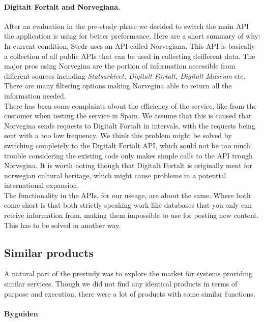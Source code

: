 \paragraph{Digitalt Fortalt and Norvegiana.}
After an evaluation in the pre-study phase we decided to switch the main API the application is using for better preformance. Here are a short summary of why:\\[4pt]

In current condition, Stedr uses an API called Norvegiana. This API is basically a collection of all public APIs that can be used in collecting deifferent data. The major pros using Norvegina are the portion of information accessible from different sources including \emph{Statsarkivet, Digitalt Fortalt, Digitalt Museum} etc. There are many filtering options making Norvegina able to return all the information needed.\\
There has been some complaints about the efficiency of the service, like from the customer when testing the service in Spain. We assume that this is caused that Norvegina sends requests to Digitalt Fortalt in intervals, with the requests being sent with a too low frequency. We think this problem might be solved by switching completely to the Digitalt Fortalt API, which sould not be too much trouble considering the existing code only makes simple calls to the API trough Norvegina. It is worth noting though that Digitalt Fortalt is originally ment for norwegian cultural heritage, which might cause problems in a potential international expansion.\\
The functionality in the APIs, for our useage, are about the same. Where both come short is that both strictly speaking work like databases that you only can retrive information from, making them impossible to use for posting new content. This has to be solved in another way.\\ 

	\subsection{Similar products}
		
A natural part of the prestudy was to explore the market for systems providing similar services. Though we did not find any identical products in terms of purpose and execution, there were a lot of products with some similar functions. 

\paragraph{Byguiden}

